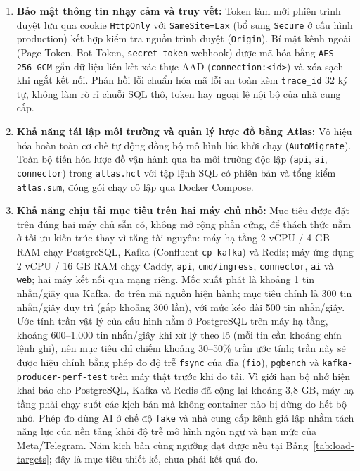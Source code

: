 \begin{enumerate}
  \item \textbf{Bảo mật thông tin nhạy cảm và truy vết:} Token làm mới phiên trình duyệt lưu qua cookie \texttt{HttpOnly} với \texttt{SameSite=Lax} (bổ sung \texttt{Secure} ở cấu hình production) kết hợp kiểm tra nguồn trình duyệt (\texttt{Origin}).
    Bí mật kênh ngoài (Page Token, Bot Token, \texttt{secret\_\hspace{0pt}token} webhook) được mã hóa bằng \texttt{AES-\hspace{0pt}256-\hspace{0pt}GCM} gắn dữ liệu liên kết xác thực AAD (\texttt{connection:\hspace{0pt}<id>}) và xóa sạch khi ngắt kết nối.
    Phản hồi lỗi chuẩn hóa mã lỗi an toàn kèm \texttt{trace\_\hspace{0pt}id} 32 ký tự, không làm rò rỉ chuỗi SQL thô, token hay ngoại lệ nội bộ của nhà cung cấp.
  \item \textbf{Khả năng tái lập môi trường và quản lý lược đồ bằng Atlas:} Vô hiệu hóa hoàn toàn cơ chế tự động đồng bộ mô hình lúc khởi chạy (\texttt{AutoMigrate}).
    Toàn bộ tiến hóa lược đồ vận hành qua ba môi trường độc lập (\texttt{api}, \texttt{ai}, \texttt{connector}) trong \texttt{atlas.\hspace{0pt}hcl} với tập lệnh SQL có phiên bản và tổng kiểm \texttt{atlas.\hspace{0pt}sum}, đóng gói chạy cô lập qua Docker Compose.
  \item \textbf{Khả năng chịu tải mục tiêu trên hai máy chủ nhỏ:} Mục tiêu được đặt trên đúng hai máy chủ sẵn có, không mở rộng phần cứng, để thách thức nằm ở tối ưu kiến trúc thay vì tăng tài nguyên: máy hạ tầng 2 vCPU / 4 GB RAM chạy PostgreSQL, Kafka (Confluent \texttt{cp-\hspace{0pt}kafka}) và Redis; máy ứng dụng 2 vCPU / 16 GB RAM chạy Caddy, \texttt{api}, \texttt{cmd/\hspace{0pt}ingress}, \texttt{connector}, \texttt{ai} và \texttt{web}; hai máy kết nối qua mạng riêng.
    Mốc xuất phát là khoảng 1 tin nhắn/giây qua Kafka, đo trên mã nguồn hiện hành; mục tiêu chính là 300 tin nhắn/giây duy trì (gấp khoảng 300 lần), với mức kéo dài 500 tin nhắn/giây.
    Ước tính trần vật lý của cấu hình nằm ở PostgreSQL trên máy hạ tầng, khoảng 600--1.000 tin nhắn/giây khi xử lý theo lô (mỗi tin cần khoảng chín lệnh ghi), nên mục tiêu chỉ chiếm khoảng 30--50\% trần ước tính; trần này sẽ được hiệu chỉnh bằng phép đo độ trễ \texttt{fsync} của đĩa (\texttt{fio}), \texttt{pgbench} và \texttt{kafka-\hspace{0pt}producer-\hspace{0pt}perf-\hspace{0pt}test} trên máy thật trước khi đo tải.
    Vì giới hạn bộ nhớ hiện khai báo cho PostgreSQL, Kafka và Redis đã cộng lại khoảng 3,8 GB, máy hạ tầng phải chạy suốt các kịch bản mà không container nào bị dừng do hết bộ nhớ.
    Phép đo dùng AI ở chế độ \texttt{fake} và nhà cung cấp kênh giả lập nhằm tách năng lực của nền tảng khỏi độ trễ mô hình ngôn ngữ và hạn mức của Meta/Telegram.
    Năm kịch bản cùng ngưỡng đạt được nêu tại Bảng~\ref{tab:load-targets}; đây là mục tiêu thiết kế, chưa phải kết quả đo.
\end{enumerate}

